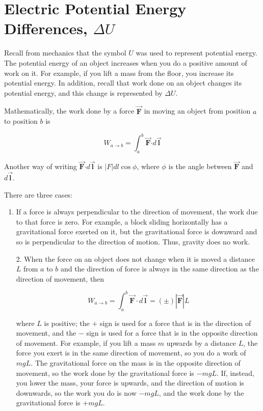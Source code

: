 \documentclass{article}
\newcommand{\bfvec}[1]{\vec{\mathbf{#1}}}
\newcommand{\bfcdot}[0]{\boldsymbol{\cdot}}
\begin{document}
\section{Electric Potential Energy Differences, $\Delta U$}

Recall from mechanics that the symbol $U$ was used to represent potential energy. The potential energy of an object increases when you do a positive amount of work on it. For example, if you lift a mass from the floor, you increase its potential energy. In addition, recall that work done on an object changes its potential energy, and this change is represented by $\Delta U$.

Mathematically, the work done by a force $\bfvec{F}$ in moving an object from position $a$ to position $b$ is

\begin{equation}
W_{a\rightarrow b}=\int_a^b \bfvec{F}\bfcdot d\bfvec{l}
\end{equation}

Another way of writing $\bfvec{F}\bfcdot d\bfvec{l}$ is $|F|dl\cos\phi$, where $\phi$ is the angle between $\bfvec{F}$ and $d{\bfvec l}$.

There are three cases:

\begin{enumerate}

  \item If a force is always perpendicular to the direction of movement, the work due to that force is zero. For example, a block sliding horizontally has a gravitational force exerted on it, but the gravitational force is downward and so is perpendicular to the direction of motion. Thus, gravity does no work.

\end{enumerate}

\begin{enumerate}

  \item[2.] When the force on an object does not change when it is moved a distance $L$ from $a$ to $b$ and the direction of force is always in the same direction as the direction of movement, then

            \begin{equation}W_{a\rightarrow b}=\int_a^b \bfvec{F}\cdot d\bfvec{l}=(\pm)|\bfvec{F}|L\end{equation}

            where $L$ is positive; the $+$ sign is used for a force that is in the direction of movement, and the $-$ sign is used for a force that is in the opposite direction of movement. For example, if you lift a mass $m$ upwards by a distance $L$, the force you exert is in the same direction of movement, so you do a work of $mgL$. The gravitational force on the mass is in the opposite direction of movement, so the work done by the gravitational force is $-mgL$. If, instead, you lower the mass, your force is upwards, and the direction of motion is downwards, so the work you do is now $-mgL$, and the work done by the gravitational force is $+mgL$.

\end{enumerate}
\end{document}
